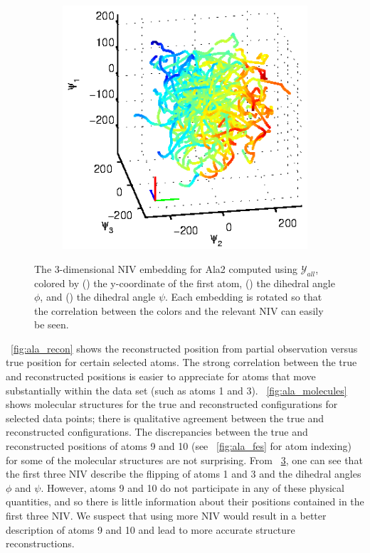 \begin{figure}[t]
\begin{subfigure}{0.3\textwidth}
    \caption{}
    \label{subfig:ala_embed2}
\end{subfigure}
\begin{subfigure}{0.3\textwidth}
    \includegraphics[width=\textwidth]{ala2_embed3}
    \caption{}
    \label{subfig:ala_embed3}
\end{subfigure}
    \caption[Intrinsic variable embeddings for alanine dipeptide data]{The 3-dimensional NIV embedding for Ala2 computed using $\mathcal{Y}_{all}$, colored by () the y-coordinate of the first atom, () the dihedral angle $\phi$, and () the dihedral angle $\psi$. Each embedding is rotated so that the correlation between the colors and the relevant NIV can easily be seen.}
    \label{fig:ala_embed}
\end{figure}


\fig~\ref{fig:ala_recon} shows the reconstructed position from partial observation versus true position for certain selected atoms.
%
The strong correlation between the true and reconstructed positions is easier to appreciate for
atoms that move substantially within the data set (such as atoms 1 and 3).
%
\fig~\ref{fig:ala_molecules} shows molecular structures for the true and reconstructed configurations for selected data points;
there is qualitative agreement between the true and reconstructed configurations.
%
The discrepancies between the true and reconstructed positions of atoms 9 and 10 (see \fig~\ref{fig:ala_fes} for atom indexing) for some of the molecular structures are not surprising.
%
From \fig~\ref{fig:ala_embed}, one can see that the first three NIV describe the flipping of atoms 1 and 3 and the dihedral angles $\phi$ and $\psi$.
%
However, atoms 9 and 10 do not participate in any of these physical quantities, and so there is little information about their positions contained in the first three NIV.
%
We suspect that using more NIV would result in a better description of atoms 9 and 10 and lead to more accurate structure reconstructions.

